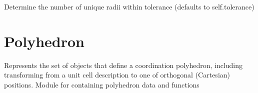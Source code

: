 \documentclass[a4paper,10pt,openany, oneside]{sphinxmanual}
\begin{document}
\begin{fulllineitems}
\begin{fulllineitems}
\end{fulllineitems}


\begin{fulllineitems}
\label{api_reference:distellipsoid.ellipsoid.Ellipsoid.uniquerad}
Determine the number of unique radii within tolerance (defaults to self.tolerance)

\end{fulllineitems}


\end{fulllineitems}



\section{Polyhedron}
\label{api_reference:polyhedron}
Represents the set of objects that define a coordination polyhedron, including transforming from a unit cell description
to one of orthogonal (Cartesian) positions.
\label{api_reference:module-distellipsoid.polyhedron}
Module for containing polyhedron data and functions
\end{document}
